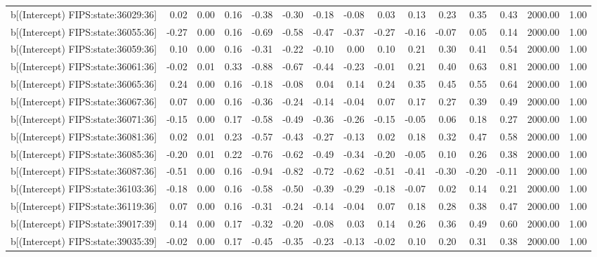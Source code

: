 \begin{table}[ht]
\begin{tabular}{rrrrrrrrrrrrrrr}
  b[(Intercept) FIPS:state:36029:36] & 0.02 & 0.00 & 0.16 & -0.38 & -0.30 & -0.18 & -0.08 & 0.03 & 0.13 & 0.23 & 0.35 & 0.43 & 2000.00 & 1.00 \\ 
  b[(Intercept) FIPS:state:36055:36] & -0.27 & 0.00 & 0.16 & -0.69 & -0.58 & -0.47 & -0.37 & -0.27 & -0.16 & -0.07 & 0.05 & 0.14 & 2000.00 & 1.00 \\ 
  b[(Intercept) FIPS:state:36059:36] & 0.10 & 0.00 & 0.16 & -0.31 & -0.22 & -0.10 & 0.00 & 0.10 & 0.21 & 0.30 & 0.41 & 0.54 & 2000.00 & 1.00 \\ 
  b[(Intercept) FIPS:state:36061:36] & -0.02 & 0.01 & 0.33 & -0.88 & -0.67 & -0.44 & -0.23 & -0.01 & 0.21 & 0.40 & 0.63 & 0.81 & 2000.00 & 1.00 \\ 
  b[(Intercept) FIPS:state:36065:36] & 0.24 & 0.00 & 0.16 & -0.18 & -0.08 & 0.04 & 0.14 & 0.24 & 0.35 & 0.45 & 0.55 & 0.64 & 2000.00 & 1.00 \\ 
  b[(Intercept) FIPS:state:36067:36] & 0.07 & 0.00 & 0.16 & -0.36 & -0.24 & -0.14 & -0.04 & 0.07 & 0.17 & 0.27 & 0.39 & 0.49 & 2000.00 & 1.00 \\ 
  b[(Intercept) FIPS:state:36071:36] & -0.15 & 0.00 & 0.17 & -0.58 & -0.49 & -0.36 & -0.26 & -0.15 & -0.05 & 0.06 & 0.18 & 0.27 & 2000.00 & 1.00 \\ 
  b[(Intercept) FIPS:state:36081:36] & 0.02 & 0.01 & 0.23 & -0.57 & -0.43 & -0.27 & -0.13 & 0.02 & 0.18 & 0.32 & 0.47 & 0.58 & 2000.00 & 1.00 \\ 
  b[(Intercept) FIPS:state:36085:36] & -0.20 & 0.01 & 0.22 & -0.76 & -0.62 & -0.49 & -0.34 & -0.20 & -0.05 & 0.10 & 0.26 & 0.38 & 2000.00 & 1.00 \\ 
  b[(Intercept) FIPS:state:36087:36] & -0.51 & 0.00 & 0.16 & -0.94 & -0.82 & -0.72 & -0.62 & -0.51 & -0.41 & -0.30 & -0.20 & -0.11 & 2000.00 & 1.00 \\ 
  b[(Intercept) FIPS:state:36103:36] & -0.18 & 0.00 & 0.16 & -0.58 & -0.50 & -0.39 & -0.29 & -0.18 & -0.07 & 0.02 & 0.14 & 0.21 & 2000.00 & 1.00 \\ 
  b[(Intercept) FIPS:state:36119:36] & 0.07 & 0.00 & 0.16 & -0.31 & -0.24 & -0.14 & -0.04 & 0.07 & 0.18 & 0.28 & 0.38 & 0.47 & 2000.00 & 1.00 \\ 
  b[(Intercept) FIPS:state:39017:39] & 0.14 & 0.00 & 0.17 & -0.32 & -0.20 & -0.08 & 0.03 & 0.14 & 0.26 & 0.36 & 0.49 & 0.60 & 2000.00 & 1.00 \\ 
  b[(Intercept) FIPS:state:39035:39] & -0.02 & 0.00 & 0.17 & -0.45 & -0.35 & -0.23 & -0.13 & -0.02 & 0.10 & 0.20 & 0.31 & 0.38 & 2000.00 & 1.00 \\ 

\end{tabular}
\end{table}
